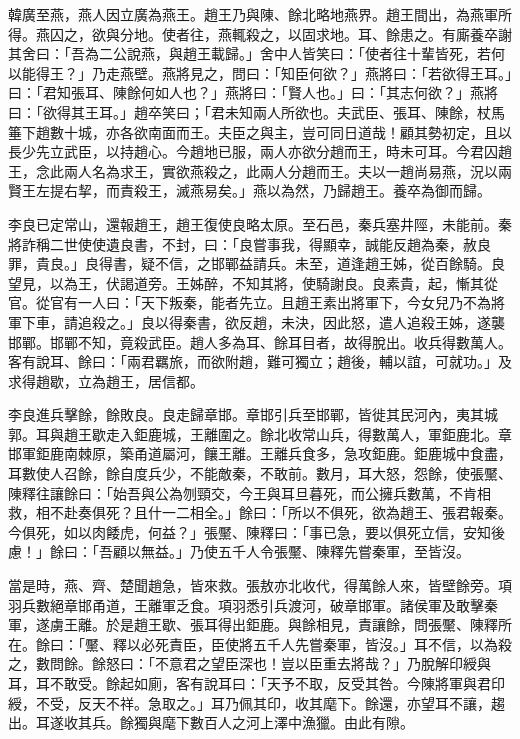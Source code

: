 \begin{pinyinscope}
韓廣至燕，燕人因立廣為燕王。趙王乃與陳、餘北略地燕界。趙王間出，為燕軍所得。燕囚之，欲與分地。使者往，燕輒殺之，以固求地。耳、餘患之。有廝養卒謝其舍曰：「吾為二公說燕，與趙王載歸。」舍中人皆笑曰：「使者往十輩皆死，若何以能得王？」乃走燕壁。燕將見之，問曰：「知臣何欲？」燕將曰：「若欲得王耳。」曰：「君知張耳、陳餘何如人也？」燕將曰：「賢人也。」曰：「其志何欲？」燕將曰：「欲得其王耳。」趙卒笑曰；「君未知兩人所欲也。夫武臣、張耳、陳餘，杖馬箠下趙數十城，亦各欲南面而王。夫臣之與主，豈可同日道哉！顧其勢初定，且以長少先立武臣，以持趙心。今趙地已服，兩人亦欲分趙而王，時未可耳。今君囚趙王，念此兩人名為求王，實欲燕殺之，此兩人分趙而王。夫以一趙尚易燕，況以兩賢王左提右挈，而責殺王，滅燕易矣。」燕以為然，乃歸趙王。養卒為御而歸。

李良已定常山，還報趙王，趙王復使良略太原。至石邑，秦兵塞井陘，未能前。秦將詐稱二世使使遺良書，不封，曰：「良嘗事我，得顯幸，誠能反趙為秦，赦良罪，貴良。」良得書，疑不信，之邯鄲益請兵。未至，道逢趙王姊，從百餘騎。良望見，以為王，伏謁道旁。王姊醉，不知其將，使騎謝良。良素貴，起，慚其從官。從官有一人曰：「天下叛秦，能者先立。且趙王素出將軍下，今女兒乃不為將軍下車，請追殺之。」良以得秦書，欲反趙，未決，因此怒，遣人追殺王姊，遂襲邯鄲。邯鄲不知，竟殺武臣。趙人多為耳、餘耳目者，故得脫出。收兵得數萬人。客有說耳、餘曰：「兩君羈旅，而欲附趙，難可獨立；趙後，輔以誼，可就功。」及求得趙歇，立為趙王，居信都。

李良進兵擊餘，餘敗良。良走歸章邯。章邯引兵至邯鄲，皆徙其民河內，夷其城郭。耳與趙王歇走入鉅鹿城，王離圍之。餘北收常山兵，得數萬人，軍鉅鹿北。章邯軍鉅鹿南棘原，築甬道屬河，饟王離。王離兵食多，急攻鉅鹿。鉅鹿城中食盡，耳數使人召餘，餘自度兵少，不能敵秦，不敢前。數月，耳大怒，怨餘，使張黶、陳釋往讓餘曰：「始吾與公為刎頸交，今王與耳旦暮死，而公擁兵數萬，不肯相救，相不赴奏俱死？且什一二相全。」餘曰：「所以不俱死，欲為趙王、張君報秦。今俱死，如以肉餧虎，何益？」張黶、陳釋曰：「事已急，要以俱死立信，安知後慮！」餘曰：「吾顧以無益。」乃使五千人令張黶、陳釋先嘗秦軍，至皆沒。

當是時，燕、齊、楚聞趙急，皆來救。張敖亦北收代，得萬餘人來，皆壁餘旁。項羽兵數絕章邯甬道，王離軍乏食。項羽悉引兵渡河，破章邯軍。諸侯軍及敢擊秦軍，遂虜王離。於是趙王歇、張耳得出鉅鹿。與餘相見，責讓餘，問張黶、陳釋所在。餘曰：「黶、釋以必死責臣，臣使將五千人先嘗秦軍，皆沒。」耳不信，以為殺之，數問餘。餘怒曰：「不意君之望臣深也！豈以臣重去將哉？」乃脫解印綬與耳，耳不敢受。餘起如廁，客有說耳曰：「天予不取，反受其咎。今陳將軍與君印綬，不受，反天不祥。急取之。」耳乃佩其印，收其麾下。餘還，亦望耳不讓，趨出。耳遂收其兵。餘獨與麾下數百人之河上澤中漁獵。由此有隙。


\end{pinyinscope}
